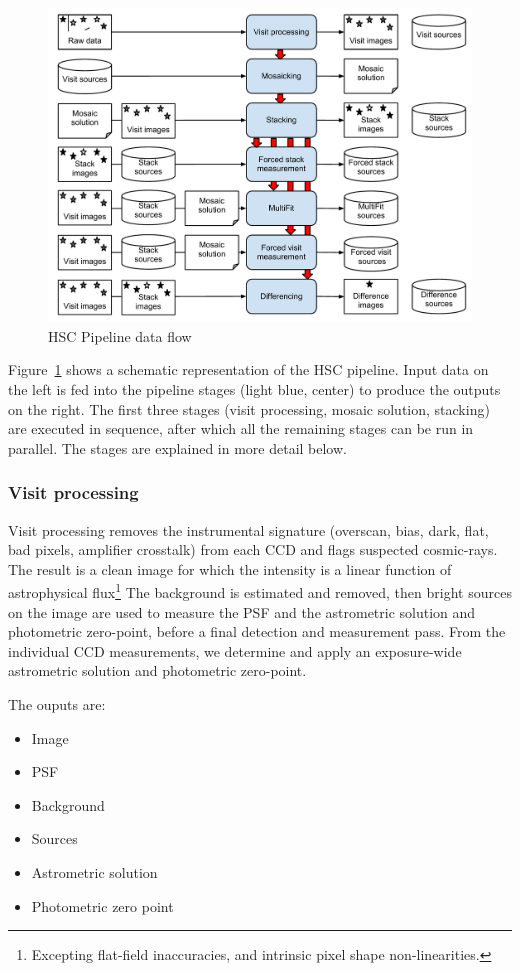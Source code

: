 \documentclass[12pt]{article}
\begin{document}
\begin{figure}[!htbp]
    \centering
    \includegraphics[scale=0.5]{figures/HSCpipelinesketch}
    \caption{HSC Pipeline data flow\label{fig:flow}}
\end{figure}

Figure~\ref{fig:flow} shows a schematic representation of the HSC pipeline.  Input data on the left is fed
into the pipeline stages (light blue, center) to produce the outputs on the right.  The first three stages
(visit processing, mosaic solution, stacking) are executed in sequence, after which all the remaining stages
can be run in parallel.  The stages are explained in more detail below.

\subsubsection{Visit processing}

Visit processing removes the instrumental signature (overscan, bias, dark, flat, bad pixels, amplifier
crosstalk) from each CCD and flags suspected cosmic-rays.  The result is a clean image for which the intensity
is a linear function of astrophysical flux\footnote{Excepting flat-field inaccuracies, and intrinsic pixel
  shape non-linearities.}  The background is estimated and removed, then bright sources on the image are used
to measure the PSF and the astrometric solution and photometric zero-point, before a final detection and
measurement pass.  From the individual CCD measurements, we determine and apply an exposure-wide astrometric
solution and photometric zero-point.

The ouputs are:
\begin{itemize}
\item Image
\item PSF
\item Background
\item Sources
\item Astrometric solution
\item Photometric zero point
\end{itemize}
\end{document}
